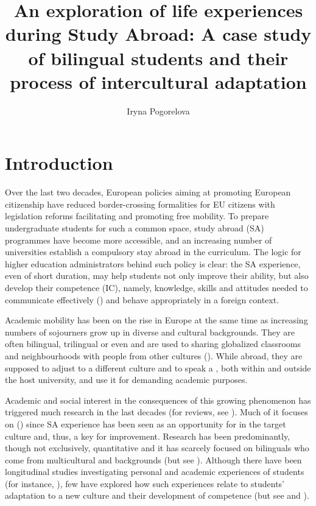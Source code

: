 \documentclass[output=paper]{langsci/langscibook}
\author{Iryna Pogorelova\affiliation{Universitat Pompeu Fabra}\lastand{Mireia Trenchs}\affiliation{Universitat Pompeu Fabra}}
\title{An exploration of life experiences during Study Abroad: A case study of bilingual students and their process of intercultural adaptation}
\begin{document}
 
 
 


\section{Introduction}

Over the last two decades, European policies aiming at promoting European citizenship have reduced border-crossing formalities for EU citizens with legislation reforms facilitating and promoting free mobility. To prepare undergraduate students for such a common space, study abroad (SA) programmes have become more accessible, and an increasing number of universities establish a compulsory stay abroad in the curriculum. The logic for higher education administrators behind such policy is clear: the SA experience, even of short duration, may help students not only improve their  ability, but also develop their  competence (IC), namely, knowledge, skills and attitudes needed to communicate effectively (\citealt{Byram1997,Deardorff2006}) and behave appropriately in a foreign context. 

Academic mobility has been on the rise in Europe at the same time as increasing numbers of sojourners grow up in diverse  and cultural backgrounds. They are often bilingual, trilingual or even  and are used to sharing globalized classrooms and neighbourhoods with people from other cultures (\citealt{Trenchs-PareraNewman2015}). While abroad, they are supposed to adjust to a different culture and to speak a , both within and outside the host university, and use it for demanding academic purposes. 

Academic and social interest in the consequences of this growing phenomenon has triggered much research in the last decades (for reviews, see \citealt{Williams2005,BehrndPorzelt2012}). Much of it focuses on   (\citealt{MitchellEtAl2015}) since SA experience has been seen as an opportunity for  in the target culture and, thus, a key for  improvement. Research has been predominantly, though not exclusively, quantitative and it has scarcely focused on bilinguals who come from multicultural and  backgrounds (but see \citealt{Pérez-Vidal2014}). Although there have been longitudinal studies investigating personal and academic experiences of students (for instance, \citealt{Isabelli-García2006}), few have explored how such experiences relate to students’ adaptation to a new culture and their development of  competence (but see \citealt{Beaven2012} and \citealt{VandeBergEtAl2009}). 
\end{document}
